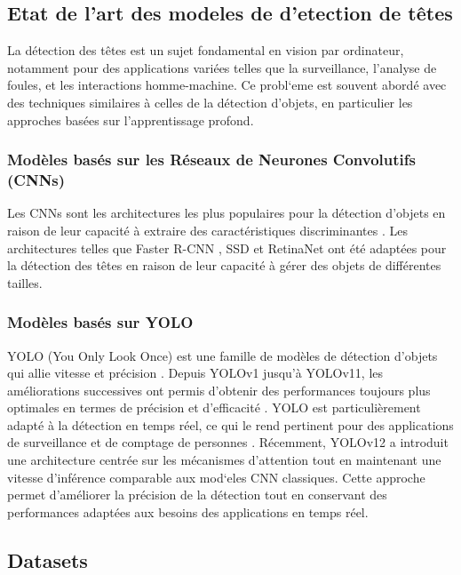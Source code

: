 
\subsection{\textbf{Etat de l'art des modeles de d'etection de têtes}}

La détection des têtes est un sujet fondamental en vision par ordinateur, notamment pour des applications variées telles que la surveillance, l'analyse de foules, et les interactions homme-machine. Ce probl`eme est souvent abordé avec des techniques similaires à celles de la détection d'objets, en particulier les approches basées sur l'apprentissage profond.

\subsubsection{\textbf{Modèles basés sur les Réseaux de Neurones Convolutifs (CNNs)}}
Les CNNs sont les architectures les plus populaires pour la détection d'objets en raison de leur capacité à extraire des caractéristiques discriminantes \cite{lecun1998gradient}. Les architectures telles que Faster R-CNN \cite{ren2015faster}, SSD \cite{liu2016ssd} et RetinaNet \cite{lin2017focal} ont été adaptées pour la détection des têtes en raison de leur capacité à gérer des objets de différentes tailles.

\subsubsection{\textbf{Modèles basés sur YOLO}}
YOLO (You Only Look Once) est une famille de modèles de détection d'objets qui allie vitesse et précision \cite{redmon2016you}. Depuis YOLOv1 jusqu'à YOLOv11, les améliorations successives ont permis d'obtenir des performances toujours plus optimales en termes de précision et d'efficacité \cite{bochkovskiy2020yolov4, jocher2023ultralytics}. YOLO est particulièrement adapté à la détection en temps réel, ce qui le rend pertinent pour des applications de surveillance et de comptage de personnes \cite{ge2019efficient, lian2021locating}. 
Récemment, YOLOv12 \cite{tian2025yolov12attentioncentricrealtimeobject} a introduit une architecture centrée sur les mécanismes d'attention tout en maintenant une vitesse d'inférence comparable aux mod`eles CNN classiques. Cette approche permet d'améliorer la précision de la détection tout en conservant des performances adaptées aux besoins des applications en temps réel.
\subsection{Datasets}

